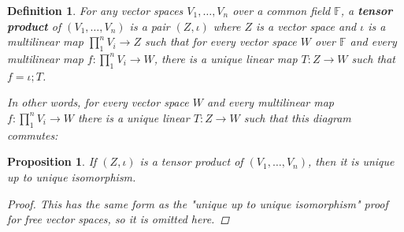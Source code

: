\documentclass[a4paper,14pt]{article}
\newtheorem*{prop}{Proposition}
\newtheorem*{defn}{Definition}
\begin{document}
\begin{defn}
    For any vector spaces $V_1, \ldots, V_n$ over a common field $\mathbb{F}$, a \textbf{tensor product} of $(V_1, \ldots, V_n)$ is a pair $(Z, \iota)$ where $Z$ is a vector space and $\iota$ is a multilinear map $\prod_1^n V_i \to Z$ such that for every vector space $W$ over $\mathbb{F}$ and every multilinear map $f: \prod_1^n V_i \to W$, there is a unique linear map $T: Z \to W$ such that $f = \iota;T$.

In other words, for every vector space $W$ and every multilinear map $f: \prod_1^n V_i \to W$ there is a unique linear $T: Z \to W$ such that this diagram commutes:

\begin{center}
\end{center}
\end{defn}

\begin{prop}
If $(Z, \iota)$ is a tensor product of $(V_1, \ldots, V_n)$, then it is unique up to unique isomorphism.
\begin{proof}
This has the same form as the "unique up to unique isomorphism" proof for free vector spaces, so it is omitted here.
\end{proof}
\end{prop}
\end{document}
